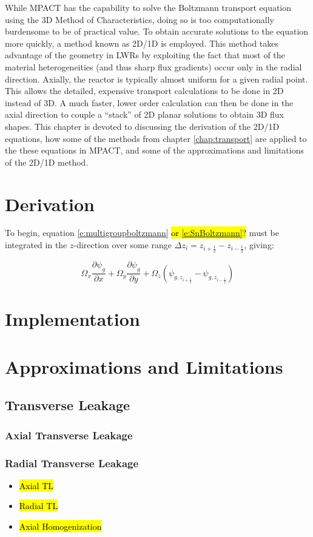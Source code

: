 While MPACT has the capability to solve the Boltzmann transport equation using the 3D Method of Characteristics, doing so is too computationally burdensome to be of practical value.  To obtain accurate solutions to the equation more quickly, a method known as 2D/1D is employed.  This method takes advantage of the geometry in LWRs by exploiting the fact that most of the material heterogeneities (and thus sharp flux gradients) occur only in the radial direction.  Axially, the reactor is typically almost uniform for a given radial point.  This allows the detailed, expensive transport calculations to be done in 2D instead of 3D.  A much faster, lower order calculation can then be done in the axial direction to couple a ``stack'' of 2D planar solutions to obtain 3D flux shapes.  This chapter is devoted to discussing the derivation of the 2D/1D equations, how some of the methods from chapter \ref{chap:transport} are applied to the these equations in MPACT, and some of the approximations and limitations of the 2D/1D method.

\section{Derivation}

To begin, equation \ref{e:multigroupboltzmann} \hl{or \ref{e:SnBoltzmann}?} must be integrated in the $z$-direction over some range $\Delta z_i = z_{i+\frac{1}{2}} - z_{i-\frac{1}{2}}$, giving:

\begin{equation}
\Omega_x\frac{\partial \psi_g}{\partial x} + \Omega_y\frac{\partial \psi_g}{\partial y} + \Omega_z\left(\psi_{g,z_{i+\frac{1}{2}}} - \psi_{g,z_{i-\frac{1}{2}}}\right)
\end{equation}

\section{Implementation}

\section{Approximations and Limitations}

\subsection{Transverse Leakage}

\subsubsection{Axial Transverse Leakage}

\subsubsection{Radial Transverse Leakage}

\begin{itemize}
\item \hl{Axial TL}
\item \hl{Radial TL}
\item \hl{Axial Homogenization}
\end{itemize}
